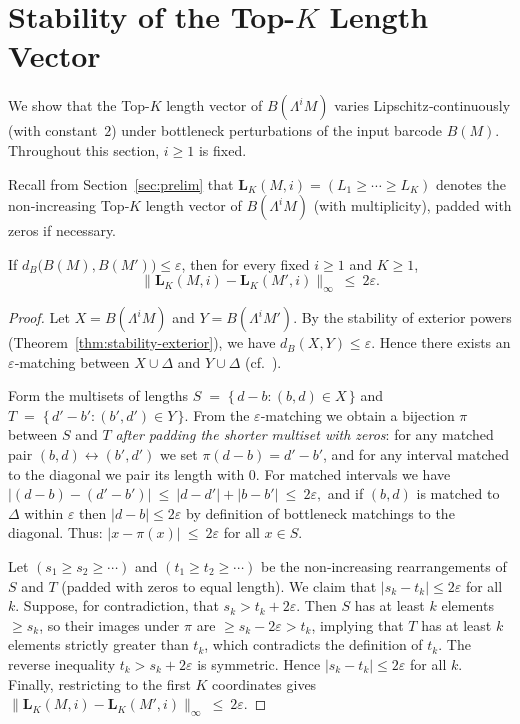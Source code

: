 \documentclass[runningheads]{llncs}
\newcommand{\B}{B}
\newcommand{\Lam}{\Lambda}
\begin{document}
\section{Stability of the Top-$K$ Length Vector}\label{sec:stability}

We show that the Top-$K$ length vector of $\B(\Lam^i M)$ varies Lipschitz‑continuously (with constant~$2$) under bottleneck perturbations of the input barcode $\B(M)$. Throughout this section, $i\ge 1$ is fixed.

Recall from Section~\ref{sec:prelim} that $\mathbf L_K(M,i)=(L_1\ge\cdots\ge L_K)$ denotes the non‑increasing Top‑$K$ length vector of $\B(\Lam^i M)$ (with multiplicity), padded with zeros if necessary.

\begin{theorem}\label{thm:stability-topk}
If $d_B\!\big(\B(M),\B(M')\big)\le \varepsilon$, then for every fixed $i\ge 1$ and $K\ge 1$,
\[
\big\|\mathbf L_K(M,i) - \mathbf L_K(M',i)\big\|_\infty \ \le\ 2\varepsilon.
\]
\end{theorem}

\begin{proof}
Let $X=\B(\Lam^i M)$ and $Y=\B(\Lam^i M')$. By the stability of exterior powers
(Theorem~\ref{thm:stability-exterior}), we have $d_B(X,Y)\le \varepsilon$. Hence there
exists an $\varepsilon$‑matching between $X\cup\Delta$ and $Y\cup\Delta$
(cf.\ \cite{CohenSteiner07,ChazalStructure16}).

Form the multisets of lengths
$S \;=\; \{\, d-b : (b,d)\in X \,\}$ and $T \;=\; \{\, d'-b' : (b',d')\in Y \,\}.$
From the $\varepsilon$‑matching we obtain a bijection $\pi$ between $S$ and $T$
\emph{after padding the shorter multiset with zeros}: for any matched pair
$(b,d)\leftrightarrow(b',d')$ we set $\pi(d-b)=d'-b'$, and for any interval matched
to the diagonal we pair its length with $0$. For matched intervals we have 
$\big|(d-b)-(d'-b')\big| \ \le\ |d-d'|+|b-b'| \ \le\ 2\varepsilon,$ 
and if $(b,d)$ is matched to $\Delta$ within $\varepsilon$ then $|d-b|\le 2\varepsilon$
by definition of bottleneck matchings to the diagonal. Thus:
$|x-\pi(x)| \ \le\ 2\varepsilon$ for all $x\in S.$

Let $(s_1\ge s_2\ge\cdots)$ and $(t_1\ge t_2\ge\cdots)$ be the non‑increasing
rearrangements of $S$ and $T$ (padded with zeros to equal length). We claim that
$|s_k-t_k|\le 2\varepsilon$ for all $k$. Suppose, for contradiction, that
$s_k>t_k+2\varepsilon$. Then $S$ has at least $k$ elements $\ge s_k$, so their
images under $\pi$ are $\ge s_k-2\varepsilon>t_k$, implying that $T$ has at least
$k$ elements strictly greater than $t_k$, which contradicts the definition of $t_k$.
The reverse inequality $t_k>s_k+2\varepsilon$ is symmetric. Hence
$|s_k-t_k|\le 2\varepsilon$ for all $k$.
Finally, restricting to the first $K$ coordinates gives
$\big\|\mathbf L_K(M,i)-\mathbf L_K(M',i)\big\|_\infty \ \le\ 2\varepsilon.$
\end{proof}
\end{document}
